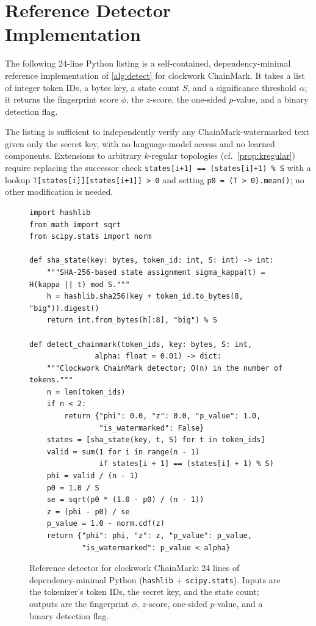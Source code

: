 \section{Reference Detector Implementation}
\label{app:refimpl}

The following 24-line Python listing is a self-contained,
dependency-minimal reference implementation of
\autoref{alg:detect} for clockwork ChainMark. It takes a list of integer
token IDs, a bytes key, a state count $S$, and a significance
threshold $\alpha$; it returns the fingerprint score $\phi$, the
$z$-score, the one-sided $p$-value, and a binary detection flag.

The listing is sufficient to independently verify any ChainMark-watermarked
text given only the secret key, with no language-model access and no
learned components. Extensions to arbitrary $k$-regular topologies
(cf.~\autoref{prop:kregular}) require replacing the successor check
\texttt{states[i+1] == (states[i]+1) \% S} with a lookup
\texttt{T[states[i]][states[i+1]] > 0} and setting \texttt{p0 =
(T > 0).mean()}; no other modification is needed.

\begin{figure}[t]
\begin{verbatim}
import hashlib
from math import sqrt
from scipy.stats import norm

def sha_state(key: bytes, token_id: int, S: int) -> int:
    """SHA-256-based state assignment sigma_kappa(t) = H(kappa || t) mod S."""
    h = hashlib.sha256(key + token_id.to_bytes(8, "big")).digest()
    return int.from_bytes(h[:8], "big") % S

def detect_chainmark(token_ids, key: bytes, S: int,
               alpha: float = 0.01) -> dict:
    """Clockwork ChainMark detector; O(n) in the number of tokens."""
    n = len(token_ids)
    if n < 2:
        return {"phi": 0.0, "z": 0.0, "p_value": 1.0,
                "is_watermarked": False}
    states = [sha_state(key, t, S) for t in token_ids]
    valid = sum(1 for i in range(n - 1)
                if states[i + 1] == (states[i] + 1) % S)
    phi = valid / (n - 1)
    p0 = 1.0 / S
    se = sqrt(p0 * (1.0 - p0) / (n - 1))
    z = (phi - p0) / se
    p_value = 1.0 - norm.cdf(z)
    return {"phi": phi, "z": z, "p_value": p_value,
            "is_watermarked": p_value < alpha}
\end{verbatim}
\caption{Reference detector for clockwork ChainMark: 24 lines of
  dependency-minimal Python (\texttt{hashlib} + \texttt{scipy.stats}).
  Inputs are the tokenizer's token IDs, the secret key, and the state
  count; outputs are the fingerprint $\phi$, $z$-score, one-sided
  $p$-value, and a binary detection flag.}
\label{fig:refimpl}
\end{figure}

